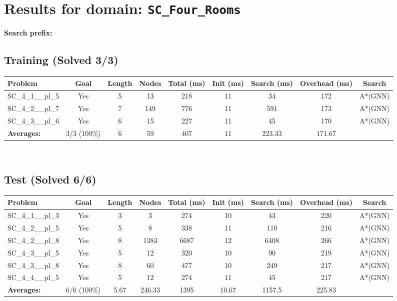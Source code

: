\documentclass{article}
\begin{document}
\section*{Results for domain: \texttt{SC\_Four\_Rooms}}
\textbf{Search prefix:} 
\\[0.5cm]
\subsection*{Training (Solved 3/3)}
\begin{tabular}{lcccccccc}
\toprule
Problem & Goal & Length & Nodes & Total (ms) & Init (ms) & Search (ms) & Overhead (ms) & Search \\
\midrule
SC\_4\_1\_\_pl\_5 & Yes & 5 & 13 & 218 & 11 & 34 & 172 & A*(GNN) \\
SC\_4\_2\_\_pl\_7 & Yes & 7 & 149 & 776 & 11 & 591 & 173 & A*(GNN) \\
SC\_4\_3\_\_pl\_6 & Yes & 6 & 15 & 227 & 11 & 45 & 170 & A*(GNN) \\
\textbf{Averages:} & 3/3 (100\%) & 6 & 59 & 407 & 11 & 223.33 & 171.67 & \\
\bottomrule
\end{tabular}
\\[0.7cm]
\subsection*{Test (Solved 6/6)}
\begin{tabular}{lcccccccc}
\toprule
Problem & Goal & Length & Nodes & Total (ms) & Init (ms) & Search (ms) & Overhead (ms) & Search \\
\midrule
SC\_4\_1\_\_pl\_3 & Yes & 3 & 3 & 274 & 10 & 43 & 220 & A*(GNN) \\
SC\_4\_2\_\_pl\_5 & Yes & 5 & 8 & 338 & 11 & 110 & 216 & A*(GNN) \\
SC\_4\_2\_\_pl\_8 & Yes & 8 & 1383 & 6687 & 12 & 6408 & 266 & A*(GNN) \\
SC\_4\_3\_\_pl\_5 & Yes & 5 & 12 & 320 & 10 & 90 & 219 & A*(GNN) \\
SC\_4\_3\_\_pl\_8 & Yes & 8 & 60 & 477 & 10 & 249 & 217 & A*(GNN) \\
SC\_4\_4\_\_pl\_5 & Yes & 5 & 12 & 274 & 11 & 45 & 217 & A*(GNN) \\
\textbf{Averages:} & 6/6 (100\%) & 5.67 & 246.33 & 1395 & 10.67 & 1157.5 & 225.83 & \\
\bottomrule
\end{tabular}
\\[0.7cm]
\end{document}
